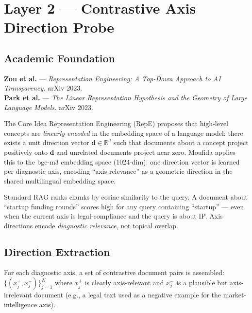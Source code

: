 \documentclass[11pt,a4paper]{article}
\begin{document}
\section{Layer 2 — Contrastive Axis Direction Probe}

\subsection{Academic Foundation}

\textbf{Zou et al.} — \textit{Representation Engineering: A Top-Down Approach to AI Transparency.}
arXiv 2023.\\
\textbf{Park et al.} — \textit{The Linear Representation Hypothesis and the Geometry of
Large Language Models.} arXiv 2023.

\begin{conceptbox}{The Core Idea}
Representation Engineering (RepE) proposes that high-level concepts are \emph{linearly
encoded} in the embedding space of a language model: there exists a unit direction vector
$\mathbf{d} \in \mathbb{R}^d$ such that documents about a concept project positively onto
$\mathbf{d}$ and unrelated documents project near zero.
Moufida applies this to the bge-m3 embedding space (1024-dim): one direction vector is
learned per diagnostic axis, encoding ``axis relevance'' as a geometric direction in the
shared multilingual embedding space.
\end{conceptbox}

\begin{notebox}
Standard RAG ranks chunks by cosine similarity to the query.
A document about ``startup funding rounds'' scores high for any query containing ``startup''
— even when the current axis is legal-compliance and the query is about IP.
Axis directions encode \emph{diagnostic relevance}, not topical overlap.
\end{notebox}

\subsection{Direction Extraction}

For each diagnostic axis, a set of contrastive document pairs is assembled:
$\{(x_j^+, x_j^-)\}_{j=1}^{N}$ where $x_j^+$ is clearly axis-relevant and $x_j^-$ is
a plausible but axis-irrelevant document (e.g., a legal text used as a negative example
for the market-intelligence axis).
\end{document}
